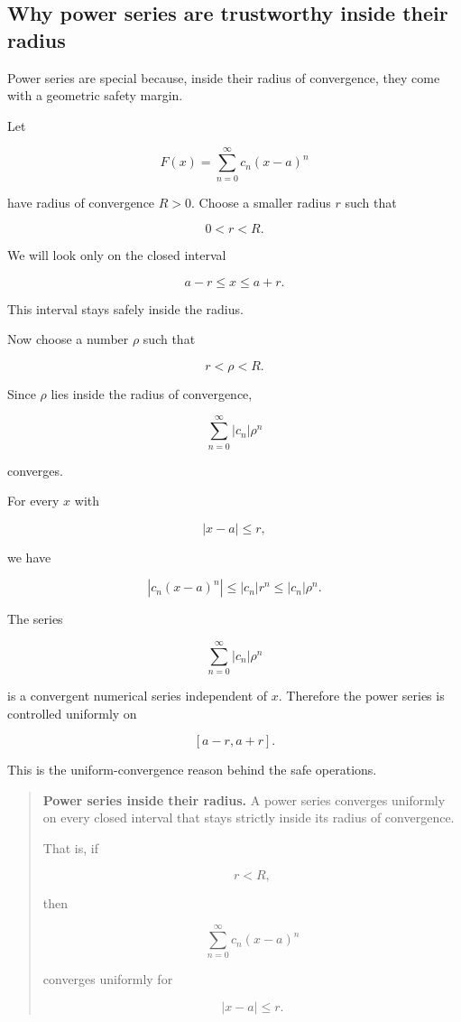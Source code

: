 \subsection{Why power series are trustworthy inside their radius}
\label{subsec:why-power-series-trustworthy}

Power series are special because, inside their radius of convergence, they come with a
geometric safety margin.

Let

\[
F(x)=\sum_{n=0}^{\infty}c_n(x-a)^n
\]

have radius of convergence \(R>0\).  Choose a smaller radius \(r\) such that

\[
0<r<R.
\]

We will look only on the closed interval

\[
a-r\le x\le a+r.
\]

This interval stays safely inside the radius.

Now choose a number \(\rho\) such that

\[
r<\rho<R.
\]

Since \(\rho\) lies inside the radius of convergence,

\[
\sum_{n=0}^{\infty}|c_n|\rho^n
\]

converges.

For every \(x\) with

\[
|x-a|\le r,
\]

we have

\[
|c_n(x-a)^n|
\le
|c_n|r^n
\le
|c_n|\rho^n.
\]

The series

\[
\sum_{n=0}^{\infty}|c_n|\rho^n
\]

is a convergent numerical series independent of \(x\).  Therefore the power series is
controlled uniformly on

\[
[a-r,a+r].
\]

This is the uniform-convergence reason behind the safe operations.

\begin{quote}
\textbf{Power series inside their radius.}
A power series converges uniformly on every closed interval that stays strictly inside
its radius of convergence.

That is, if

\[
r<R,
\]

then

\[
\sum_{n=0}^{\infty}c_n(x-a)^n
\]

converges uniformly for

\[
|x-a|\le r.
\]
\end{quote}

